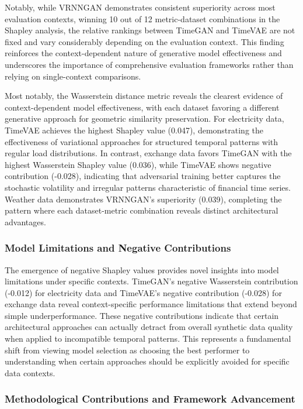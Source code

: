 \documentclass{article}
\begin{document}
Notably, while VRNNGAN demonstrates consistent superiority across most evaluation contexts, winning 10 out of 12 metric-dataset combinations in the Shapley analysis, the relative rankings between TimeGAN and TimeVAE are not fixed and vary considerably depending on the evaluation context. This finding reinforces the context-dependent nature of generative model effectiveness and underscores the importance of comprehensive evaluation frameworks rather than relying on single-context comparisons.

Most notably, the Wasserstein distance metric reveals the clearest evidence of context-dependent model effectiveness, with each dataset favoring a different generative approach for geometric similarity preservation. For electricity data, TimeVAE achieves the highest Shapley value (0.047), demonstrating the effectiveness of variational approaches for structured temporal patterns with regular load distributions. In contrast, exchange data favors TimeGAN with the highest Wasserstein Shapley value (0.036), while TimeVAE shows negative contribution (-0.028), indicating that adversarial training better captures the stochastic volatility and irregular patterns characteristic of financial time series. Weather data demonstrates VRNNGAN's superiority (0.039), completing the pattern where each dataset-metric combination reveals distinct architectural advantages.

\subsubsection*{Model Limitations and Negative Contributions}

The emergence of negative Shapley values provides novel insights into model limitations under specific contexts. TimeGAN's negative Wasserstein contribution (-0.012) for electricity data and TimeVAE's negative contribution (-0.028) for exchange data reveal context-specific performance limitations that extend beyond simple underperformance. These negative contributions indicate that certain architectural approaches can actually detract from overall synthetic data quality when applied to incompatible temporal patterns. This represents a fundamental shift from viewing model selection as choosing the best performer to understanding when certain approaches should be explicitly avoided for specific data contexts.

\subsubsection*{Methodological Contributions and Framework Advancement}
\end{document}
